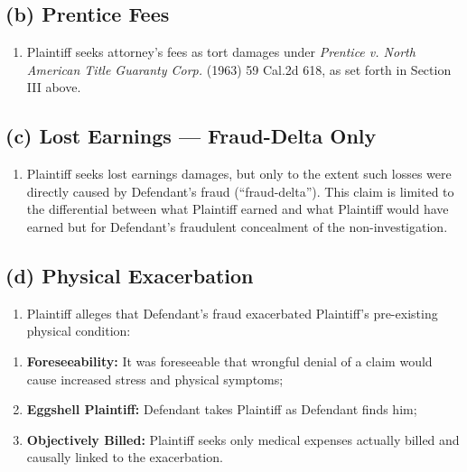 \subsection{(b) Prentice Fees}\label{b-prentice-fees}

\begin{enumerate}
\def\labelenumi{\arabic{enumi}.}
\setcounter{enumi}{31}
\tightlist
\item
  Plaintiff seeks attorney's fees as tort damages under \emph{Prentice v. North American Title Guaranty Corp.} (1963) 59 Cal.2d 618, as set forth in Section III above.
\end{enumerate}

\subsection{(c) Lost Earnings --- Fraud-Delta Only}\label{c-lost-earnings-fraud-delta-only}

\begin{enumerate}
\def\labelenumi{\arabic{enumi}.}
\setcounter{enumi}{32}
\tightlist
\item
  Plaintiff seeks lost earnings damages, but only to the extent such losses were directly caused by Defendant's fraud (``fraud-delta''). This claim is limited to the differential between what Plaintiff earned and what Plaintiff would have earned but for Defendant's fraudulent concealment of the non-investigation.
\end{enumerate}

\subsection{(d) Physical Exacerbation}\label{d-physical-exacerbation}

\begin{enumerate}
\def\labelenumi{\arabic{enumi}.}
\setcounter{enumi}{33}
\tightlist
\item
  Plaintiff alleges that Defendant's fraud exacerbated Plaintiff's pre-existing physical condition:
\end{enumerate}

\begin{enumerate}
\def\labelenumi{(\alph{enumi})}
\tightlist
\item
  \textbf{Foreseeability:} It was foreseeable that wrongful denial of a claim would cause increased stress and physical symptoms;
\item
  \textbf{Eggshell Plaintiff:} Defendant takes Plaintiff as Defendant finds him;
\item
  \textbf{Objectively Billed:} Plaintiff seeks only medical expenses actually billed and causally linked to the exacerbation.
\end{enumerate}

